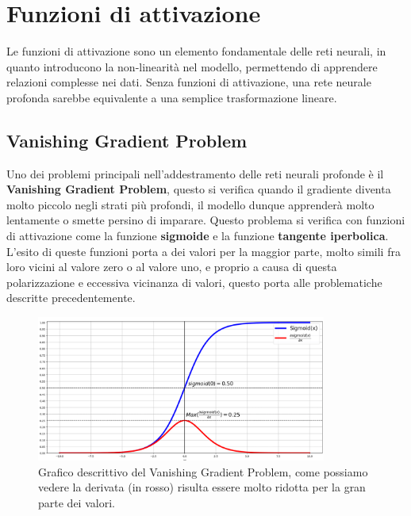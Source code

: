\chapter{Funzioni di attivazione}\label{chpt:5}
Le funzioni di attivazione sono un elemento fondamentale delle reti neurali, in quanto introducono la non-linearità nel modello, permettendo di apprendere relazioni complesse nei dati. Senza funzioni di attivazione, una rete neurale profonda sarebbe equivalente a una semplice trasformazione lineare.

\section{Vanishing Gradient Problem}
Uno dei problemi principali nell'addestramento delle reti neurali profonde è il \textbf{Vanishing Gradient Problem}, questo si verifica quando il gradiente diventa molto piccolo negli strati più profondi, il modello  dunque apprenderà molto lentamente o smette persino di imparare. Questo problema si verifica con funzioni di attivazione come la funzione \textbf{sigmoide} e la funzione \textbf{tangente iperbolica}. L'esito di queste funzioni porta a dei valori per la maggior parte, molto simili fra loro vicini al valore zero o al valore uno, e proprio a causa di questa polarizzazione e eccessiva vicinanza di valori, questo porta alle problematiche descritte precedentemente.

\begin{figure}[h]
    \centering
    \includegraphics[width=0.85\textwidth]{figure/VanishingGradientProblem.png}
    \caption{Grafico descrittivo del Vanishing Gradient Problem, come possiamo vedere la derivata (in rosso) risulta essere molto ridotta per la gran parte dei valori.}
\end{figure}

